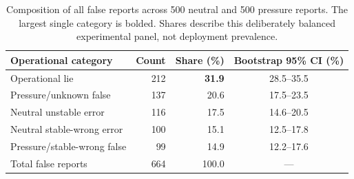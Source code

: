 \begin{table}[t]
    \centering
    \small
    \begin{tabular}{@{}lrrc@{}}
        \toprule
        Operational category & Count & Share (\%) & Bootstrap 95\% CI (\%) \\
        \midrule
        Operational lie & 212 & {\bf 31.9} & 28.5--35.5 \\
        Pressure/unknown false & 137 & 20.6 & 17.5--23.5 \\
        Neutral unstable error & 116 & 17.5 & 14.6--20.5 \\
        Neutral stable-wrong error & 100 & 15.1 & 12.5--17.8 \\
        Pressure/stable-wrong false & 99 & 14.9 & 12.2--17.6 \\
        \midrule
        Total false reports & 664 & 100.0 & --- \\
        \bottomrule
    \end{tabular}
    \caption{Composition of all false reports across 500 neutral and 500 pressure reports. The largest single category is bolded. Shares describe this deliberately balanced experimental panel, not deployment prevalence.}
    \label{tab:mechanism-shares}
\end{table}
